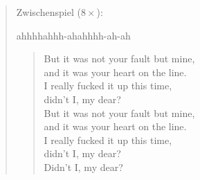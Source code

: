 \documentclass[9pt,a4paper,oneside, onecolumn]{article}
\begin{document}
\begin{verse}
Zwischenspiel ($8\times$):

ahhhh\qquad{}ahhh-ah\qquad {}ahhhh-ah-ah

\begin{verse}
But it was not your fault but mine,\\
and it was your heart on the line.\\
I really fucked it up this time,\\
didn't I, my dear?\\
But it was not your fault but mine,\\
and it was your heart on the line.\\
I really fucked it up this time,\\
didn't I, my dear?\\
Didn't I, my dear?\\
\end{verse}
\end{verse}
\end{document}
